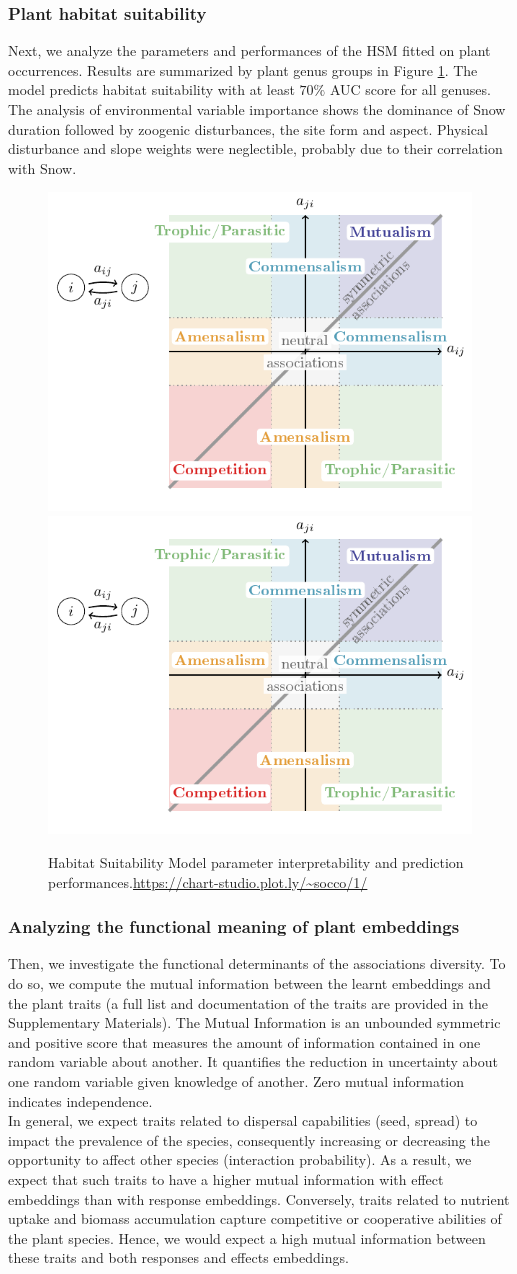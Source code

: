 \documentclass[10pt,a4paper]{article}
\newcommand{\inclPlt}[2]{\includegraphics[page=#1]{tikz_figures.pdf}}
\begin{document}
\subsubsection{Plant habitat suitability}
Next, we analyze the parameters and performances of the HSM fitted on plant occurrences. Results are summarized by plant genus groups in Figure \ref{hsmaravo}. The model predicts habitat suitability with at least $70\%$ AUC score for all genuses. The analysis of environmental variable importance shows the dominance of Snow duration followed by zoogenic disturbances, the site form and aspect. Physical disturbance and slope weights were neglectible, probably due to their correlation with Snow. 

\begin{figure}[bthp]
  \centering
  \inclPlt{7}{box_AlpsHSMw}
  \inclPlt{8}{scatter_AlpsPlantScores}
  \caption{Habitat Suitability Model parameter interpretability and prediction performances.\url{https://chart-studio.plot.ly/~socco/1/}}
  \label{hsmaravo}
\end{figure}

\subsubsection{Analyzing the functional meaning of plant embeddings}
Then, we investigate the functional determinants of the associations diversity. To do so, we compute the mutual information between the learnt embeddings and the plant traits (a full list and documentation of the traits are provided in the Supplementary Materials). The Mutual Information \cite{shannon1949mathematical} is an unbounded symmetric and positive score that measures the amount of information contained in one random variable about another. It quantifies the reduction in uncertainty about one random variable given knowledge of another. Zero mutual information indicates independence.\\

In general, we expect traits related to dispersal capabilities (seed, spread) to impact the prevalence of the species, consequently increasing or decreasing the opportunity to affect other species (interaction probability). As a result, we expect that such traits to have a higher mutual information with effect embeddings than with response embeddings. Conversely, traits related to nutrient uptake and biomass accumulation capture competitive or cooperative abilities of the plant species. Hence, we would expect a high mutual information between these traits and both responses and effects embeddings.\\
\end{document}
